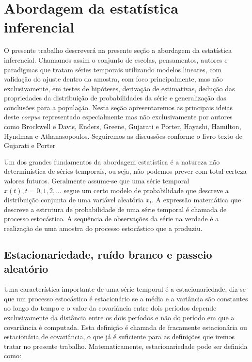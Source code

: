 \documentclass[twocolumn]{rbef}
\newcommand{\1}{\mathbbm{1}}
\begin{document}
\section{Abordagem da estatística inferencial} \label{inferential}

O presente trabalho descreverá na presente seção a abordagem da estatística inferencial. Chamamos assim o conjunto de escolas, pensamentos, autores e paradigmas que tratam séries temporais utilizando modelos lineares, com validação do ajuste dentro da amostra, com foco principalmente, mas não exclusivamente, em testes de hipóteses, derivação de estimativas, dedução das propriedades da distribuição de probabilidades da série e generalização das conclusões para a população. Nesta seção apresentaremos as principais ideias deste \textit{corpus} representado especialmente mas não exclusivamente por autores como Brockwell e Davis\cite{Brockwell}, Enders\cite{Enders}, Greene\cite{Greene}, Gujarati e Porter\cite{Gujarati}, Hayashi\cite{Hayashi}, Hamilton\cite{Hamilton}, Hyndman e Athanasopoulos\cite{Hyndman}. Seguiremos as discussões conforme o livro texto de Gujarati e Porter \cite{Gujarati}

Um dos grandes fundamentos da abordagem estatística é a natureza não determinística de séries temporais, ou seja, não podemos prever com total certeza valores futuros. Geralmente assume-se que uma série temporal ${x(t),t=0,1,2,...}$ segue um certo modelo de probabilidade que descreve a distribuição conjunta de uma variável aleatória $x_{t}$. A expressão matemática que descreve a estrutura de probabilidade de uma série temporal é chamada de processo estocástico. A sequência de observações da série na verdade é a realização de uma amostra do processo estocástico que a produziu.

\subsection{Estacionariedade, ruído branco e passeio aleatório} \label{stationary}

Uma característica importante de uma série temporal é a estacionariedade, diz-se que um processo estocástico é estacionário se a média e a variância são constantes ao longo do tempo e o valor da covariância entre dois períodos depende exclusivamente da distância entre os dois períodos e não do período em que a covariância é computada. Esta definição é chamada de fracamente estacionária ou estacionária de covariância, o que já é suficiente para as definições que iremos tratar no presente trabalho. Matematicamente, estacionariedade pode ser definida como:
\end{document}
